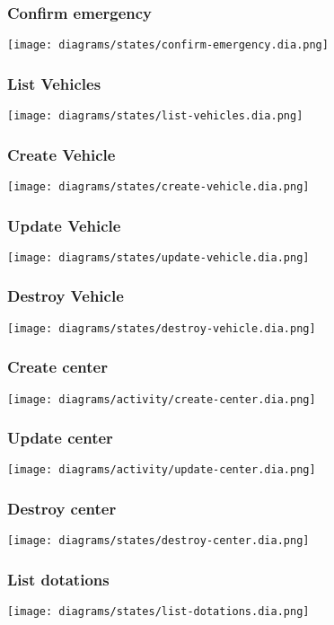 \subsubsection{Confirm emergency}
\texttt{[image: diagrams/states/confirm-emergency.dia.png]}

\subsubsection{List Vehicles}
\texttt{[image: diagrams/states/list-vehicles.dia.png]}

\subsubsection{Create Vehicle}
\texttt{[image: diagrams/states/create-vehicle.dia.png]}

\subsubsection{Update Vehicle}
\texttt{[image: diagrams/states/update-vehicle.dia.png]}

\subsubsection{Destroy Vehicle}
\texttt{[image: diagrams/states/destroy-vehicle.dia.png]}

\subsubsection{Create center}
\texttt{[image: diagrams/activity/create-center.dia.png]}

\subsubsection{Update center}
\texttt{[image: diagrams/activity/update-center.dia.png]}

\subsubsection{Destroy center}
\texttt{[image: diagrams/states/destroy-center.dia.png]}

\subsubsection{List dotations}
\texttt{[image: diagrams/states/list-dotations.dia.png]}

